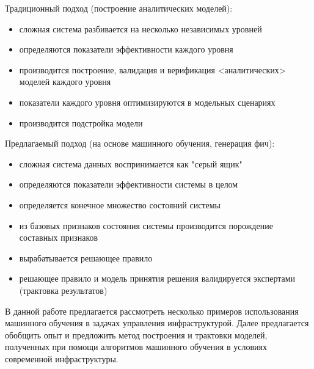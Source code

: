 
{\actuality} 

Традиционный подход (построение аналитических моделей):
\begin{itemize}
\item  сложная система разбивается на несколько независимых уровней
\item  определяются показатели эффективности каждого уровня
\item  производится построение, валидация и верификация <аналитических> моделей каждого уровня
\item  показатели каждого уровня оптимизируются в модельных сценариях
\item  производится подстройка модели
\end{itemize}


Предлагаемый подход (на основе машинного обучения, генерация фич):
\begin{itemize}
\item  сложная система данных воспринимается как "серый ящик"
\item  определяются показатели эффективности системы в целом
\item  определяется конечное множество состояний системы
\item  из базовых признаков состояния системы производится порождение составных признаков
\item  вырабатывается решающее правило
\item  решающее правило и модель принятия решения валидируется экспертами (трактовка результатов)
\end{itemize}

В данной работе предлагается рассмотреть несколько примеров использования машинного обучения в задачах управления инфраструктурой. Далее предлагается обобщить опыт и предложить метод построения и трактовки моделей, полученных при помощи алгоритмов машинного обучения в условиях современной инфраструктуры.


